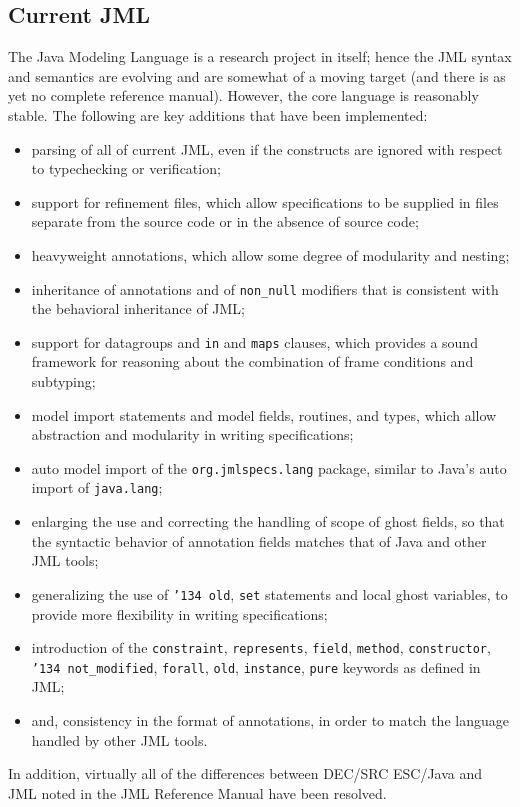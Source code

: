 \documentclass{sig-alternate}
\begin{document}
\subsection{Current JML}
The Java Modeling Language is a research project in itself; hence the
JML syntax and semantics are evolving and are somewhat of a moving
target (and there is as yet no complete reference manual).  However,
the core language is reasonably stable.  The following are key
additions that have been implemented:
\setlength{\partopsep}{0in}\setlength{\parskip}{0in}\setlength{\itemsep}{0in}\setlength{\topsep}{0in}
\begin{itemize}
\setlength{\partopsep}{0in}\setlength{\parskip}{0in}\setlength{\itemsep}{0in}\setlength{\topsep}{0in}
\item parsing of all of current JML, even if the constructs are
  ignored with respect to typechecking or verification;
\item support for refinement files, which allow specifications to be supplied in files separate from the source code or in the absence of source code;
\item heavyweight annotations, which allow some degree of modularity and nesting;
\item inheritance of annotations and of \texttt{non\_null}
  modifiers that is consistent with the behavioral inheritance of JML;
\item support for datagroups and \texttt{in} and \texttt{maps} clauses, which provides a sound framework for reasoning about the combination of frame conditions and subtyping;
\item model import statements and model fields, routines, and types, which allow abstraction 
and modularity in writing specifications;
\item auto model import of the \texttt{org.jmlspecs.lang} package, similar to Java's auto import of \texttt{java.lang};
\item enlarging the use and correcting the handling of scope of ghost fields, so that the syntactic behavior 
of annotation fields matches that of Java and other JML tools;
\item generalizing the use of \texttt{\char'134 old}, \texttt{set} statements and local ghost variables, to provide more flexibility in writing specifications;
\item introduction of the \texttt{constraint}, \texttt{represents}, \texttt{field}, \texttt{method},
\texttt{constructor}, 
\texttt{\char'134 not\_modified}, \texttt{forall}, \texttt{old}, \texttt{instance}, \texttt{pure} keywords as defined in JML;
\item and, consistency in the format of annotations, in order to match the language handled by other JML tools.
\end{itemize}
In addition, virtually all of the differences between DEC/SRC ESC/Java
and JML noted in the JML Reference Manual have been resolved.
\end{document}
